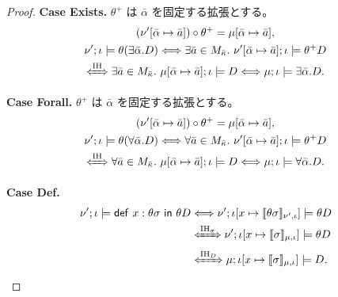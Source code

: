\documentclass[a4paper,11pt]{article}
\theoremstyle{definition}
\newenvironment{Case}[1]{\par\smallskip\noindent\textbf{Case #1.}\enspace\ignorespaces}{\par}
\newcommand{\den}[1]{\llbracket #1\rrbracket}
\newcommand{\Def}[3]{\mathsf{def}\ #1:#2\ \mathsf{in}\ #3}
\begin{document}
\begin{proof}
\begin{Case}{Exists}
$\theta^+$ は $\bar\alpha$ を固定する拡張とする。
\begin{gather*}
 (\nu'[\bar\alpha\mapsto\bar a])\circ\theta^+
       =\mu[\bar\alpha\mapsto\bar a],\\
 \nu';\iota\models\theta(\exists\bar\alpha.D)
 \Longleftrightarrow \exists\bar a\in M_{\bar\kappa}.\
       \nu'[\bar\alpha\mapsto\bar a];\iota\models\theta^+D\\
 \xLeftrightarrow{\mathrm{IH}} \exists\bar a\in M_{\bar\kappa}.\
       \mu[\bar\alpha\mapsto\bar a];\iota\models D
 \Longleftrightarrow\mu;\iota\models\exists\bar\alpha.D.
\end{gather*}
\end{Case}

\begin{Case}{Forall}
$\theta^+$ は $\bar\alpha$ を固定する拡張とする。
\begin{gather*}
 (\nu'[\bar\alpha\mapsto\bar a])\circ\theta^+
       =\mu[\bar\alpha\mapsto\bar a],\\
 \nu';\iota\models\theta(\forall\bar\alpha.D)
 \Longleftrightarrow \forall\bar a\in M_{\bar\kappa}.\
       \nu'[\bar\alpha\mapsto\bar a];\iota\models\theta^+D\\
 \xLeftrightarrow{\mathrm{IH}} \forall\bar a\in M_{\bar\kappa}.\
       \mu[\bar\alpha\mapsto\bar a];\iota\models D
 \Longleftrightarrow\mu;\iota\models\forall\bar\alpha.D.
\end{gather*}
\end{Case}

\begin{Case}{Def}
\begin{align*}
 \nu';\iota\models\Def x{\theta\sigma}{\theta D}
 &\Longleftrightarrow\nu';\iota[x\mapsto\den{\theta\sigma}_{\nu',\iota}]\models\theta D\\
 &\xLeftrightarrow{\mathrm{IH}_\sigma}\nu';\iota[x\mapsto\den\sigma_{\mu,\iota}]\models\theta D\\
 &\xLeftrightarrow{\mathrm{IH}_D}\mu;\iota[x\mapsto\den\sigma_{\mu,\iota}]\models D.
\end{align*}
\end{Case}


\end{proof}
\end{document}
